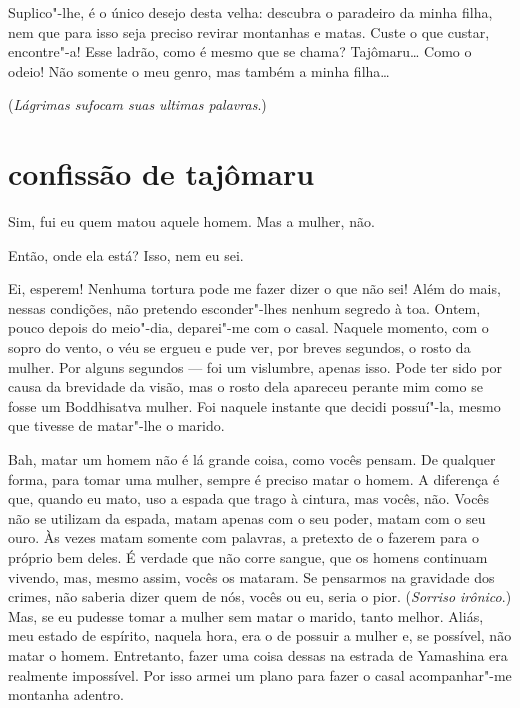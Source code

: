 Suplico"-lhe, é o único desejo desta velha: descubra o paradeiro da minha
filha, nem que para isso seja preciso revirar montanhas e matas. Custe
o que custar, encontre"-a! Esse ladrão, como é mesmo que se chama?
Tajômaru\ldots{} Como o odeio! Não somente o meu genro, mas também a minha
filha\ldots{}

(\textit{Lágrimas sufocam suas ultimas palavras}.)

\section*{confissão de tajômaru}

Sim, fui eu quem matou aquele homem. Mas a mulher, não.

Então, onde ela está? Isso, nem eu sei.

Ei, esperem! Nenhuma tortura pode me fazer dizer o que não sei! Além do
mais, nessas condições, não pretendo esconder"-lhes nenhum segredo à
toa. Ontem, pouco depois do meio"-dia, deparei"-me com o casal. Naquele
momento, com o sopro do vento, o véu se ergueu e pude ver, por breves
segundos, o rosto da mulher. Por alguns segundos --- foi um vislumbre,
apenas isso. Pode ter sido por causa da brevidade da visão, mas o rosto
dela  apareceu perante mim como se fosse um Boddhisatva mulher. Foi
naquele instante que decidi possuí"-la, mesmo que tivesse de matar"-lhe o
marido.

Bah, matar um homem não é lá grande coisa, como vocês pensam. De
qualquer forma, para tomar uma mulher, sempre é preciso matar o homem.
A diferença é que, quando eu mato, uso a espada que trago à cintura,
mas vocês, não. Vocês não se utilizam da espada, matam apenas com o seu
poder, matam com o seu ouro. Às vezes matam somente com palavras, a
pretexto de o fazerem para o próprio bem deles. É verdade que não corre
sangue, que os homens continuam vivendo, mas, mesmo assim, vocês os
mataram. Se pensarmos na gravidade dos crimes, não saberia dizer quem
de nós, vocês ou eu, seria o pior. (\textit{Sorriso irônico}.) Mas, se eu
pudesse tomar a mulher sem matar o marido, tanto melhor. Aliás, meu
estado de espírito, naquela hora, era o de possuir a mulher e, se
possível, não matar o homem. Entretanto, fazer uma coisa dessas na
estrada de Yamashina era realmente impossível. Por isso armei um plano
para fazer o casal acompanhar"-me montanha adentro.

